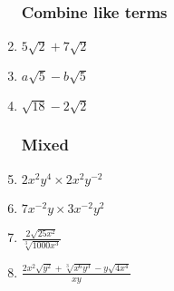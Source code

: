 \documentclass[12pt, twoside]{article}
\begin{document}
\begin{enumerate}[itemsep=2cm]
\newpage
\subsubsection*{Combine like terms}
  \item $5\sqrt{2}+7\sqrt{2}$
  \item $a\sqrt{5}-b\sqrt{5}$
  \item $\sqrt{18}-2\sqrt{2}$

\subsubsection*{Mixed}
  \item $2x^2y^4 \times 2x^2y^{-2}$
  \item $7x^{-2}y \times 3x^{-2}y^{2}$
  \item $\displaystyle  \frac{2 \sqrt{25x^2}}{\sqrt[3]{1000x^{3}}}$
  \item $\displaystyle  \frac{2x^2\sqrt{y^2}+\sqrt[3]{x^6y^3}-y\sqrt{4x^4}}{xy}$
  
\end{enumerate}
\end{document}
